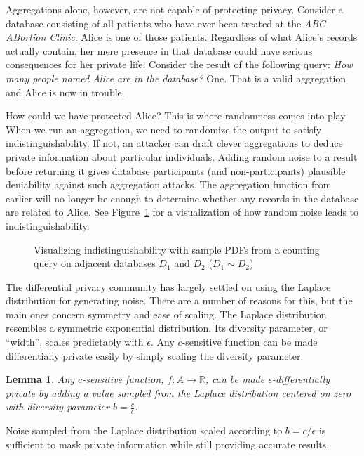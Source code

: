 \documentclass[12pt]{report}
\newtheorem{lem}[defn]{Lemma}
\begin{document}
Aggregations alone, however, are not capable of protecting privacy.
Consider a database consisting of all patients who have ever been treated at the \textit{ABC ABortion Clinic}.
Alice is one of those patients.
Regardless of what Alice's records actually contain, her mere presence in that database could have serious consequences for her private life.
Consider the result of the following query: \textit{How many people named Alice are in the database?}
One.
That is a valid aggregation and Alice is now in trouble.

How could we have protected Alice?
This is where randomness comes into play.
When we run an aggregation, we need to randomize the output to satisfy indistinguishability.
If not, an attacker can draft clever aggregations to deduce private information about particular individuals.
Adding random noise to a result before returning it gives database participants (and non-participants) plausible deniability against such aggregation attacks.
The aggregation function from earlier will no longer be enough to determine whether any records in the database are related to Alice.
See Figure~\ref{fig:indistinguishability} for a visualization of how random noise leads to indistinguishability.

\begin{figure}
    \centering
    \def\svgwidth{0.75  \columnwidth}
    
    \caption{Visualizing indistinguishability with sample PDFs from a counting query on adjacent databases $D_1$ and $D_2$ ($D_1\sim D_2$)}
    \label{fig:indistinguishability}
\end{figure}

The differential privacy community has largely settled on using the Laplace distribution for generating noise.
There are a number of reasons for this, but the main ones concern symmetry and ease of scaling.
The Laplace distribution resembles a symmetric exponential distribution.
Its diversity parameter, or ``width'', scales predictably with $\epsilon$.
Any $c$-sensitive function can be made differentially private easily by simply scaling the diversity parameter.

\begin{lem}
Any $c$-sensitive function, $f : A \rightarrow \mathbb R$, can be made $\epsilon$-differentially private by adding a value sampled from the Laplace distribution centered on zero with diversity parameter $b=\frac{c}{\epsilon}$.
\end{lem}

Noise sampled from the Laplace distribution scaled according to $b=c/\epsilon$ is sufficient to mask private information while still providing accurate results.
\end{document}
